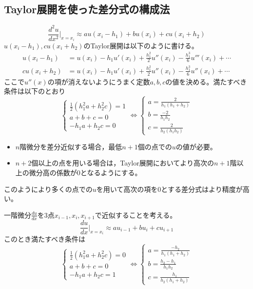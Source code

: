 \documentclass{jsreport}
\begin{document}
\subsection{Taylor展開を使った差分式の構成法}
\begin{equation} \label{eq:Taylor展開を使った差分式}
	\frac{d^2u}{dx^2}\Big|_{x= x_i}\approx au(x_i- h_1)+ bu(x_i)+ cu(x_i+ h_2)
\end{equation}
	$u(x_i- h_1), cu(x_i+ h_2)$のTaylor展開は以下のように書ける。
\begin{align*}
	u(x_i- h_1)
	&= u(x_i)- h_1u'(x_i)+ \frac{h_1^2}{2}u''(x_i)- \frac{h_1^3}{6}u'''(x_i)+ \cdots\\
	cu(x_i+ h_2)
	&= u(x_i)- h_1u'(x_i)+ \frac{h_1^2}{2}u''(x_i)- \frac{h_1^3}{6}u''(x_i)+ \cdots
\end{align*}
	ここで$u''(x)$の項が消えないようにうまく定数$a, b, c$の値を決める。満たすべき条件は以下のとおり
\begin{equation*}
\begin{cases}
	\frac{1}{2}(h_1^2a+ h_2^2c)= 1\\
	a+ b+ c= 0\\
	-h_1a+ h_2c= 0
\end{cases}
	\Longleftrightarrow
\begin{cases}
	a= \frac{2}{h_1(h_1+ h_2)}\\
	b= \frac{-2}{h_1h_2}\\
	c= \frac{2}{h_2(h_1h_2)}
\end{cases}
\end{equation*}

\begin{itemize}
	\item $n$階微分を差分近似する場合，最低$n+ 1$個の点での$u$の値が必要。
	\item $n+ 2$個以上の点を用いる場合は，Taylor展開においてより高次の$n+ 1$階以上の微分高の係数が0となるようにする。
\end{itemize}
	このようにより多くの点での$u$を用いて高次の項を0とする差分式はより精度が高い。

	一階微分$\frac{du}{dx}$を3点$x_{i- 1}, x_i, x_{i+ 1}$で近似することを考える。
\begin{equation*}
	\frac{du}{dx}\Big|_{x= x_i}\approx au_{i- 1}+ bu_i+ cu_{i+ 1}
\end{equation*}
	このとき満たすべき条件は
\begin{equation*}
\begin{cases}
	\frac{1}{2}(h_1^2a+ h_2^2c)= 0\\
	a+ b+ c= 0\\
	-h_1a+ h_2c= 1
\end{cases}
	\Longleftrightarrow
\begin{cases}
	a= \frac{-h_2}{h_1(h_1+ h_2)}\\
	b= \frac{h_2- h_1}{h_1h_2}\\
	c= \frac{h_1}{h_2(h_1+ h_2)}
\end{cases}
\end{equation*}
\end{document}
